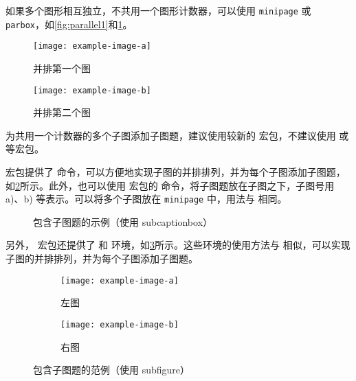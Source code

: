 如果多个图形相互独立，不共用一个图形计数器，可以使用 \texttt{minipage} 或 \texttt{parbox}，如\cref{fig:parallel1}和\cref{fig:parallel2}。

\begin{figure}[!htp]
\begin{minipage}{0.4\textwidth}
\centering
\texttt{[image: example-image-a]}
\caption{并排第一个图}
\label{fig:parallel1}
\end{minipage}\hfill
\begin{minipage}{0.4\textwidth}
\centering
\texttt{[image: example-image-b]}
\caption{并排第二个图}
\label{fig:parallel2}
\end{minipage}
\end{figure}

为共用一个计数器的多个子图添加子图题，建议使用较新的  宏包，不建议使用  或  等宏包。

 宏包提供了  命令，可以方便地实现子图的并排排列，并为每个子图添加子图题，如\cref{fig:subcaptionbox}所示。此外，也可以使用  宏包的  命令，将子图题放在子图之下，子图号用 a)、b) 等表示。可以将多个子图放在 \texttt{minipage} 中，用法与  相同。

\begin{figure}[!htp]
\centering
{}
\hspace{1cm}
\caption{包含子图题的示例（使用 subcaptionbox）}
\label{fig:subcaptionbox}
\end{figure}

另外， 宏包还提供了  和  环境，如\cref{fig:subfigure}所示。这些环境的使用方法与  相似，可以实现子图的并排排列，并为每个子图添加子图题。

\begin{figure}[!htp]
  \centering
  \begin{subfigure}{0.3\textwidth}
    \centering
    \texttt{[image: example-image-a]}
    \caption{左图}
  \end{subfigure}
  \hspace{1cm}
  \begin{subfigure}{0.4\textwidth}
    \centering
    \texttt{[image: example-image-b]}
    \caption{右图}
  \end{subfigure}
  \caption{包含子图题的范例（使用 subfigure）}
  \label{fig:subfigure}
\end{figure}



